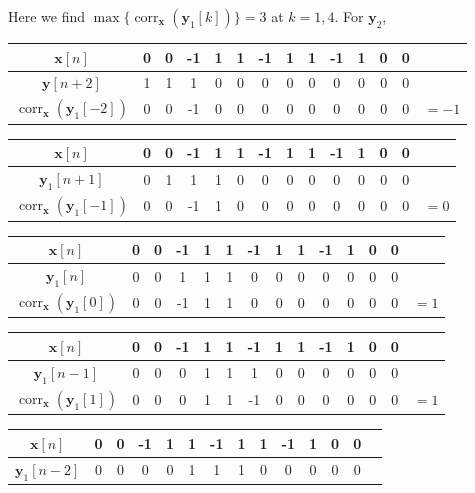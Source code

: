 \documentclass[]{article}
\renewcommand{\vec}[1]{\mathbf{#1}}
\newcommand{\corr}{\operatorname{corr}}
\begin{document}
Here we find \(\max\{\corr_{\vec{x}}(\vec{y}_1[k])\} = 3\) at \(k = 1, 4\). For \(\vec{y}_2\), 

\begin{flushleft}
\begin{tabular}{c|ccccccccccccc}
	\(\vec{x}[n]\) & 0 & 0 & -1 & 1 & 1 & -1 & 1 & 1 & -1 & 1 & 0 & 0 \\
	\hline
	\(\vec{y}[n + 2]\) & 1 & 1 & 1 & 0 & 0 & 0 & 0 & 0 & 0 & 0 & 0 & 0 \\
	\(\corr_{\vec{x}}(\vec{y}_1[-2])\) & 0 & 0 & -1 & 0 & 0 & 0 & 0 & 0 & 0 & 0 & 0 & 0 & \(= -1\) \\
\end{tabular} \vspace{5 mm}
\begin{tabular}{c|ccccccccccccc}
	\(\vec{x}[n]\) & 0 & 0 & -1 & 1 & 1 & -1 & 1 & 1 & -1 & 1 & 0 & 0 \\
	\hline
	\(\vec{y}_1[n + 1]\) & 0 & 1 & 1 & 1 & 0 & 0 & 0 & 0 & 0 & 0 & 0 & 0 \\
	\(\corr_{\vec{x}}(\vec{y}_1[-1])\) & 0 & 0 & -1 & 1 & 0 & 0 & 0 & 0 & 0 & 0 & 0 & 0 & \(= 0\) \\
\end{tabular} \vspace{5 mm}
\begin{tabular}{c|ccccccccccccc}
	\(\vec{x}[n]\) & 0 & 0 & -1 & 1 & 1 & -1 & 1 & 1 & -1 & 1 & 0 & 0 \\
	\hline
	\(\vec{y}_1[n]\) & 0 & 0 & 1 & 1 & 1 & 0 & 0 & 0 & 0 & 0 & 0 & 0 \\
	\(\corr_{\vec{x}}(\vec{y}_1[0])\) & 0 & 0 & -1 & 1 & 1 & 0 & 0 & 0 & 0 & 0 & 0 & 0 & \(= 1\) \\
\end{tabular} \vspace{5 mm}
\begin{tabular}{c|ccccccccccccc}
	\(\vec{x}[n]\) & 0 & 0 & -1 & 1 & 1 & -1 & 1 & 1 & -1 & 1 & 0 & 0 \\
	\hline
	\(\vec{y}_1[n - 1]\) & 0 & 0 & 0 & 1 & 1 & 1 & 0 & 0 & 0 & 0 & 0 & 0 \\
	\(\corr_{\vec{x}}(\vec{y}_1[1])\) & 0 & 0 & 0 & 1 & 1 & -1 & 0 & 0 & 0 & 0 & 0 & 0 & \(= 1\) \\
\end{tabular} \vspace{5 mm}
\begin{tabular}{c|ccccccccccccc}
	\(\vec{x}[n]\) & 0 & 0 & -1 & 1 & 1 & -1 & 1 & 1 & -1 & 1 & 0 & 0 \\
	\hline
	\(\vec{y}_1[n - 2]\) & 0 & 0 & 0 & 0 & 1 & 1 & 1 & 0 & 0 & 0 & 0 & 0 \\

\end{tabular}
\end{flushleft}
\end{document}
